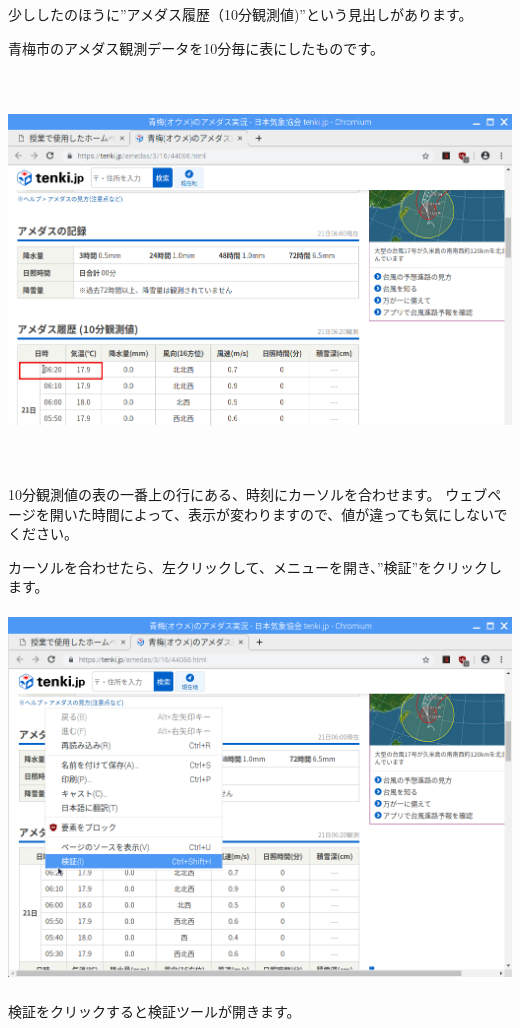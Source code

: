 \documentclass[a4paper,12pt,dvipdfmx]{jarticle}
\begin{document}
\bigskip

\clearpage
少ししたのほうに”アメダス履歴（10分観測値)”という見出しがあります。

青梅市のアメダス観測データを10分毎に表にしたものです。



\begin{center}
\includegraphics[width=17.006cm,height=10.433cm]{textbook-img033.png}

\end{center}
10分観測値の表の一番上の行にある、時刻にカーソルを合わせます。
ウェブページを開いた時間によって、表示が変わりますので、値が違っても気にしないでください。

カーソルを合わせたら、左クリックして、メニューを開き、”検証”をクリックします。

\begin{center}
\includegraphics[width=17.006cm,height=9.843cm]{textbook-img034.png}

\end{center}
\clearpage
検証をクリックすると検証ツールが開きます。
\end{document}
